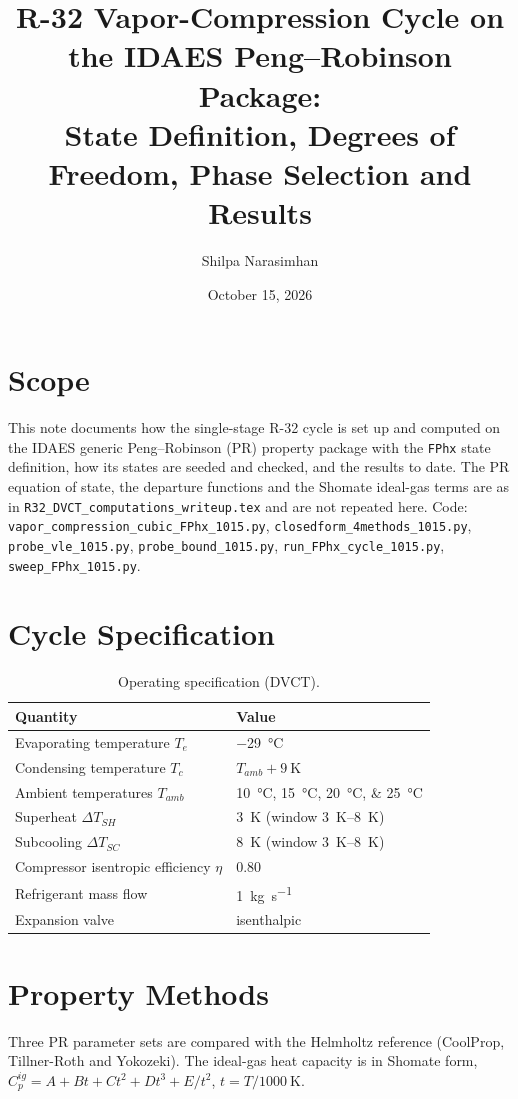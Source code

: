 \documentclass{article}
\title{R-32 Vapor-Compression Cycle on the IDAES Peng--Robinson Package:\\
State Definition, Degrees of Freedom, Phase Selection and Results}
\author{Shilpa Narasimhan}
\date{October 15, 2026}
\begin{document}
\maketitle

\section{Scope}
This note documents how the single-stage R-32 cycle is set up and computed on
the IDAES generic Peng--Robinson (PR) property package with the \texttt{FPhx}
state definition, how its states are seeded and checked, and the results to
date. The PR equation of state, the departure functions and the Shomate
ideal-gas terms are as in \texttt{R32\_DVCT\_computations\_writeup.tex} and are
not repeated here. Code: \texttt{vapor\_compression\_cubic\_FPhx\_1015.py},
\texttt{closedform\_4methods\_1015.py}, \texttt{probe\_vle\_1015.py},
\texttt{probe\_bound\_1015.py}, \texttt{run\_FPhx\_cycle\_1015.py},
\texttt{sweep\_FPhx\_1015.py}.

\section{Cycle Specification}
\begin{table}[h]
\centering
\begin{tabular}{ll}
\toprule
Quantity & Value \\
\midrule
Evaporating temperature $T_e$ & \SI{-29}{\celsius} \\
Condensing temperature $T_c$ & $T_{amb} + \SI{9}{\kelvin}$ \\
Ambient temperatures $T_{amb}$ & \SIlist{10;15;20;25}{\celsius} \\
Superheat $\Delta T_{SH}$ & \SI{3}{\kelvin} (window \SIrange{3}{8}{\kelvin}) \\
Subcooling $\Delta T_{SC}$ & \SI{8}{\kelvin} (window \SIrange{3}{8}{\kelvin}) \\
Compressor isentropic efficiency $\eta$ & 0.80 \\
Refrigerant mass flow & \SI{1}{\kilo\gram\per\second} \\
Expansion valve & isenthalpic \\
\bottomrule
\end{tabular}
\caption{Operating specification (DVCT).}
\end{table}

\section{Property Methods}
Three PR parameter sets are compared with the Helmholtz reference
(CoolProp, Tillner-Roth and Yokozeki). The ideal-gas heat capacity is in Shomate form,
$C_p^{ig} = A + Bt + Ct^2 + Dt^3 + E/t^2$, $t = T/\SI{1000}{\kelvin}$.
\end{document}
